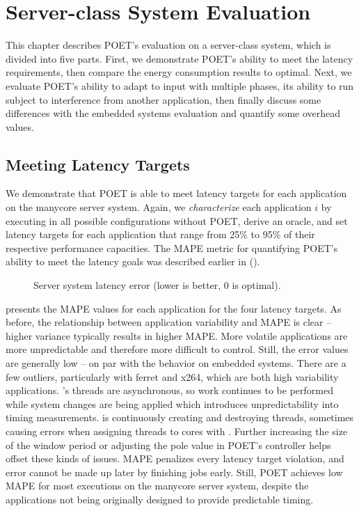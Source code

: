 \section{Server-class System Evaluation}
\label{sec:poet-server-evaluation}

This chapter describes POET's evaluation on a server-class system, which is divided into five parts.
First, we demonstrate POET's ability to meet the latency requirements, then compare the energy consumption results to optimal.
Next, we evaluate POET's ability to adapt to input with multiple phases, its ability to run subject to interference from another application, then finally discuss some differences with the embedded systems evaluation and quantify some overhead values.


\subsection{Meeting Latency Targets}

We demonstrate that POET is able to meet latency targets for each application on the manycore server system.
Again, we \emph{characterize} each application $i$ by executing in all possible configurations without POET, derive an oracle, and set latency targets for each application that range from 25\% to 95\% of their respective performance capacities.
The MAPE metric for quantifying POET's ability to meet the latency goals was described earlier in  ().

\begin{figure}[t]
  \centering
    
  \caption{Server system latency error (lower is better, 0 is optimal).}
  \label{fig:poet-mape-server}
\end{figure}

 presents the MAPE values for each application for the four latency targets.
As before, the relationship between application variability and MAPE is clear -- higher variance typically results in higher MAPE.
More volatile applications are more unpredictable and therefore more difficult to control.
Still, the error values are generally low -- on par with the behavior on embedded systems.
There are a few outliers, particularly with ferret and x264, which are both high variability applications.
's threads are asynchronous, so work continues to be performed while system changes are being applied which introduces unpredictability into timing measurements.
 is continuously creating and destroying threads, sometimes causing errors when assigning threads to cores with .
Further increasing the size of the window period or adjusting the pole value in POET's controller helps offset these kinds of issues.
MAPE penalizes every latency target violation, and error cannot be made up later by finishing jobs early.
Still, POET achieves low MAPE for most executions on the manycore server system, despite the applications not being originally designed to provide predictable timing.


